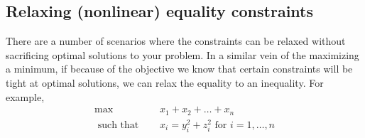 {\subsection{Relaxing (nonlinear) equality constraints}

There are a number of scenarios where the constraints can be relaxed without sacrificing optimal solutions to your problem.   In a similar vein of the maximizing a minimum, if because of the objective we know that certain constraints will be tight at optimal solutions, we can relax the equality to an inequality.   For example, 
\begin{align*}
\max   \quad &x_1 + x_2 +  \dots + x_n\\
\text{ such that } \quad &  x_i = y_i^2 + z_i^2 \text{ for } i=1, \dots, n
\end{align*}






%
%
%

}
